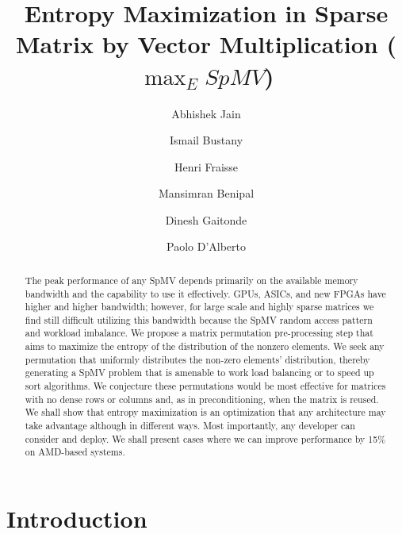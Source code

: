 \documentclass[acmsmall]{acmart}
\begin{document}
\title{Entropy Maximization in Sparse Matrix by Vector Multiplication ($\max_E SpMV$) }

\author{Abhishek Jain}
\author{Ismail Bustany}
\author{Henri Fraisse}
\author{Mansimran Benipal}
\author{Dinesh Gaitonde}
\author{Paolo D'Alberto}

\renewcommand{\shortauthors}{Jain et al.}

\begin{abstract}
The peak performance of any SpMV depends primarily on the available
memory bandwidth and the capability to use it effectively. GPUs,
ASICs, and new FPGAs have higher and higher bandwidth; however, for
large scale and highly sparse matrices we find still difficult
utilizing this bandwidth because the SpMV random access pattern and
workload imbalance.  We propose a matrix permutation pre-processing
step that aims to maximize the entropy of the distribution of the
nonzero elements.  We seek any permutation that uniformly distributes
the non-zero elements' distribution, thereby generating a SpMV problem
that is amenable to work load balancing or to speed up sort
algorithms.  We conjecture these permutations would be most effective
for matrices with no dense rows or columns and, as in preconditioning,
when the matrix is reused. We shall show that entropy maximization is
an optimization that any architecture may take advantage although in
different ways. Most importantly, any developer can consider and
deploy. We shall present cases where we can improve performance by
15\% on AMD-based systems.

\end{abstract}

\maketitle

\section{Introduction} 
\label{sec:introduction}
\end{document}
